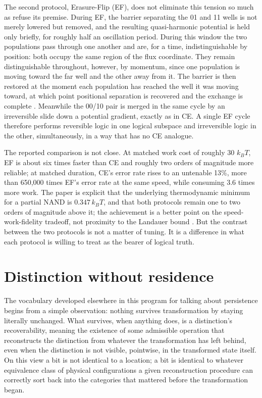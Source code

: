 \documentclass[11pt]{article}
\begin{document}
The second protocol, Erasure-Flip (EF), does not eliminate this tension so much as refuse its premise. During EF, the barrier separating the 01 and 11 wells is not merely lowered but removed, and the resulting quasi-harmonic potential is held only briefly, for roughly half an oscillation period. During this window the two populations pass through one another and are, for a time, indistinguishable by position: both occupy the same region of the flux coordinate. They remain distinguishable throughout, however, by momentum, since one population is moving toward the far well and the other away from it. The barrier is then restored at the moment each population has reached the well it was moving toward, at which point positional separation is recovered and the exchange is complete \cite{RayCrutchfield2023,TangRayCrutchfield2026}. Meanwhile the 00/10 pair is merged in the same cycle by an irreversible slide down a potential gradient, exactly as in CE. A single EF cycle therefore performs reversible logic in one logical subspace and irreversible logic in the other, simultaneously, in a way that has no CE analogue.

The reported comparison is not close. At matched work cost of roughly 30 $k_BT$, EF is about six times faster than CE and roughly two orders of magnitude more reliable; at matched duration, CE's error rate rises to an untenable 13\%, more than 650{,}000 times EF's error rate at the same speed, while consuming 3.6 times more work. The paper is explicit that the underlying thermodynamic minimum for a partial NAND is $0.347\,k_BT$, and that both protocols remain one to two orders of magnitude above it; the achievement is a better point on the speed-work-fidelity tradeoff, not proximity to the Landauer bound \cite{Landauer1961,Likharev1982}. But the contrast between the two protocols is not a matter of tuning. It is a difference in what each protocol is willing to treat as the bearer of logical truth.

\section{Distinction without residence}

The vocabulary developed elsewhere in this program for talking about persistence begins from a simple observation: nothing survives transformation by staying literally unchanged. What survives, when anything does, is a distinction's recoverability, meaning the existence of some admissible operation that reconstructs the distinction from whatever the transformation has left behind, even when the distinction is not visible, pointwise, in the transformed state itself. On this view a bit is not identical to a location; a bit is identical to whatever equivalence class of physical configurations a given reconstruction procedure can correctly sort back into the categories that mattered before the transformation began.
\end{document}

